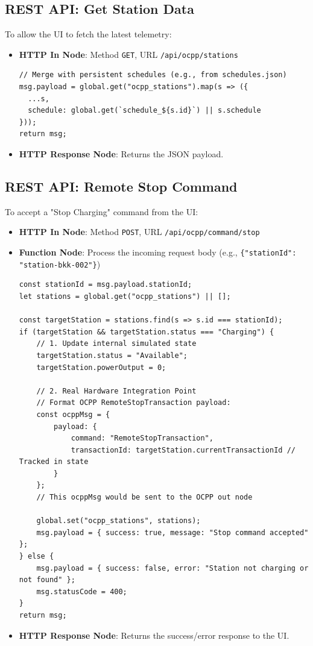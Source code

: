 \documentclass{article}
\begin{document}
\subsection{REST API: Get Station Data}
To allow the UI to fetch the latest telemetry:
\begin{itemize}
    \item \textbf{HTTP In Node}: Method \texttt{GET}, URL \texttt{/api/ocpp/stations}
\begin{lstlisting}
// Merge with persistent schedules (e.g., from schedules.json)
msg.payload = global.get("ocpp_stations").map(s => ({
  ...s,
  schedule: global.get(`schedule_${s.id}`) || s.schedule
}));
return msg;
\end{lstlisting}
    \item \textbf{HTTP Response Node}: Returns the JSON payload.
\end{itemize}

\subsection{REST API: Remote Stop Command}
To accept a "Stop Charging" command from the UI:
\begin{itemize}
    \item \textbf{HTTP In Node}: Method \texttt{POST}, URL \texttt{/api/ocpp/command/stop}
    \item \textbf{Function Node}: Process the incoming request body (e.g., \texttt{\{"stationId": "station-bkk-002"\}})
\begin{lstlisting}[caption=Handle Remote Stop Request]
const stationId = msg.payload.stationId;
let stations = global.get("ocpp_stations") || [];

const targetStation = stations.find(s => s.id === stationId);
if (targetStation && targetStation.status === "Charging") {
    // 1. Update internal simulated state
    targetStation.status = "Available";
    targetStation.powerOutput = 0;
    
    // 2. Real Hardware Integration Point
    // Format OCPP RemoteStopTransaction payload:
    const ocppMsg = {
        payload: {
            command: "RemoteStopTransaction",
            transactionId: targetStation.currentTransactionId // Tracked in state
        }
    };
    // This ocppMsg would be sent to the OCPP out node
    
    global.set("ocpp_stations", stations);
    msg.payload = { success: true, message: "Stop command accepted" };
} else {
    msg.payload = { success: false, error: "Station not charging or not found" };
    msg.statusCode = 400;
}
return msg;
\end{lstlisting}
    \item \textbf{HTTP Response Node}: Returns the success/error response to the UI.
\end{itemize}
\end{document}
